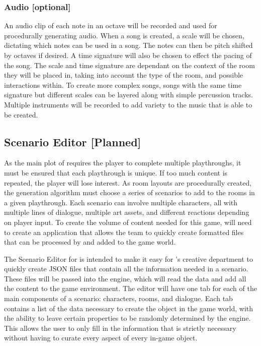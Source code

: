 \documentclass{GlobalDocument}
\begin{document}
\subsubsection{Audio [optional]}
\label{sec:audio_generation}
An audio clip of each note in an octave will be recorded and used for procedurally generating audio. When a song is created, a scale will be chosen, dictating which notes can  be used in a song. The notes can then be pitch shifted by octaves if desired. A time signature will also be chosen to effect the pacing of the song. The scale and time signature are dependant on the context of the room they will be placed in, taking into account the type of the room, and possible interactions within. To create more complex songs, songs with the same time signature but different scales can be layered along with simple percussion tracks. Multiple instruments will be recorded to add variety to the music that is able to be created.

\subsection{Scenario Editor [Planned]}
\label{sec:scenario_editor}
As the main plot of \ourgame{} requires the player to complete multiple playthroughs, it must be ensured that each playthrough is unique. If too much content is repeated, the player will lose interest. As room layouts are procedurally created, the generation algorithm must choose a series of scenarios to add to the rooms in a given playthrough. Each scenario can involve multiple characters, all with multiple lines of dialogue, multiple art assets, and different reactions depending on player input. To create the volume of content needed for this game, \ourteam{} will need to create an application that allows the team to quickly create formatted files that can be processed by \ourengine{} and added to the game world.

The Scenario Editor for \ourgame{} is intended to make it easy for \ourteam{}'s creative department to quickly create JSON files that contain all the information needed in a scenario. These files will be passed into the engine, which will read the data and add all the content to the game environment. The editor will have one tab for each of the main components of a scenario: characters, rooms, and dialogue. Each tab contains a list of the data necessary to create the object in the game world, with the ability to leave certain properties to be randomly determined by the engine. This allows the user to only fill in the information that is strictly necessary without having to curate every aspect of every in-game object.
\end{document}
